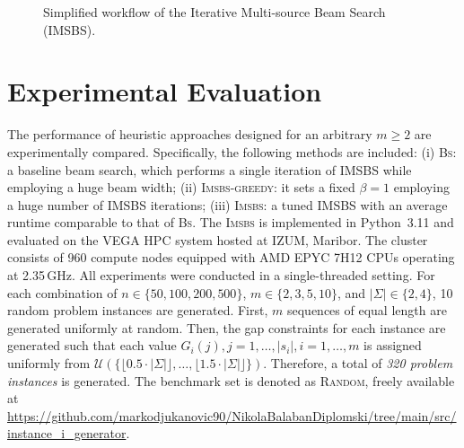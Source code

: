 \documentclass[runningheads]{llncs}
\begin{document}
\begin{figure}[!ht]
{}
   	
   	\caption{Simplified workflow of the Iterative Multi-source Beam Search (IMSBS).}
   	\label{fig:imsbs_workflow}
   \end{figure}
   
     
	
\section{Experimental Evaluation}\label{sec: experiments}
   
The performance of heuristic approaches designed for an arbitrary \( m \geq 2 \) are experimentally compared. Specifically, the following methods are included: (i) \textsc{Bs}: a baseline beam search, which performs a single iteration of IMSBS while employing a huge beam width; (ii) \textsc{Imsbs-greedy}: it sets a fixed  \( \beta = 1 \) %
   employing a huge number of IMSBS iterations; (iii) \textsc{Imsbs}: a tuned IMSBS with an average runtime comparable to that of \textsc{Bs}.	 The \textsc{Imsbs} is implemented in Python~3.11 and evaluated on the VEGA HPC system hosted at IZUM, Maribor. The cluster consists of 960 compute nodes equipped with AMD EPYC 7H12 CPUs operating at 2.35\,GHz. All experiments were conducted in a single-threaded setting.  For each combination of  $n \in \{50, 100, 200, 500\}$, $m \in \{2, 3, 5, 10\}$, and $|\Sigma| \in \{2, 4\}$, 10 random problem instances are generated. First, $m$ sequences of equal length are generated uniformly at random. Then, the gap constraints for each instance are generated such that each value $G_i(j), j=1, \ldots, |s_i|, i=1, \ldots, m$ is  assigned uniformly from 
 $\mathcal{U}(\{ \lfloor 0.5 \cdot |\Sigma| \rfloor, \ldots, \lfloor 1.5 \cdot |\Sigma| \rfloor \})$.  Therefore, a total of \textit{320 problem instances} is generated. The benchmark set is denoted as \textsc{Random}, freely available at   
 \url{https://github.com/markodjukanovic90/NikolaBalabanDiplomski/tree/main/src/instance_i_generator}.
 
\end{document}
